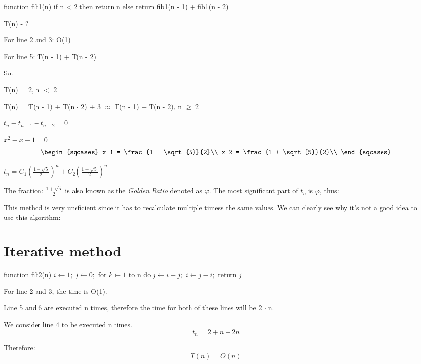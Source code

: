 \documentclass{article}
\begin{document}
	\begin{algorithm}[caption={Recursive method}, label={Fibonacci1}]
function fib1(n)
	if n < 2 then
		return n
	else
		return fib1(n - 1) + fib1(n - 2)
	\end{algorithm}
	\begin{center} T(n) - ? \end{center}
	\par For line 2 and 3: O(1)
	\par For line 5: T(n - 1) + T(n - 2)
	\par So:
	\par T(n) = 2, n $<$ 2
	\par T(n) = T(n - 1) + T(n - 2) + 3 $\approx$ T(n - 1) + T(n - 2), n $\geq$ 2
	\begin{center}
		$t_{n} - t_{n - 1} - t_{n - 2} = 0$
		\par $x^2 - x - 1 = 0$
		\[
			\begin{sqcases}
				x_1 = \frac{1 - \sqrt{5}}{2}\\
				x_2 = \frac{1 + \sqrt{5}}{2}\\
			\end{sqcases}
		\]

		$t_n = C_1 (\frac{1 - \sqrt{5}}{2})^n + C_2 (\frac{1 + \sqrt{5}}{2})^n$
	\end{center}
	\par The fraction: \textit{$\frac{1 + \sqrt{5}}{2}$} is also known as the \textit{Golden Ratio} denoted as $\varphi$.
	The most significant part of $t_n$ is $\varphi$, thus:


	\par This method is very uneficient since it has to recalculate multiple timess the same values. We can clearly see why it's not a good idea to use this algorithm:



	\newpage
	\section{Iterative method}
		\begin{algorithm}[caption={Iterative method}, label={Fibonacci2}]
function fib2(n)
	$i \leftarrow 1;$
	$j \leftarrow 0;$
	for $k \leftarrow 1$ to n do
		$j \leftarrow i + j;$
		$i \leftarrow j - i;$
	return $j$
		\end{algorithm}

		\par For line 2 and 3, the time is O(1).
		\par Line 5 and 6 are executed n times, therefore the time for both of these lines will be 2 $\cdot$ n.
		\par We consider line 4 to be executed n times.
		\newline
		\[
			t_n = 2 + n + 2n
		\]
		\par Therefore:
		\[
			T(n) = O(n)
		\]
\end{document}
